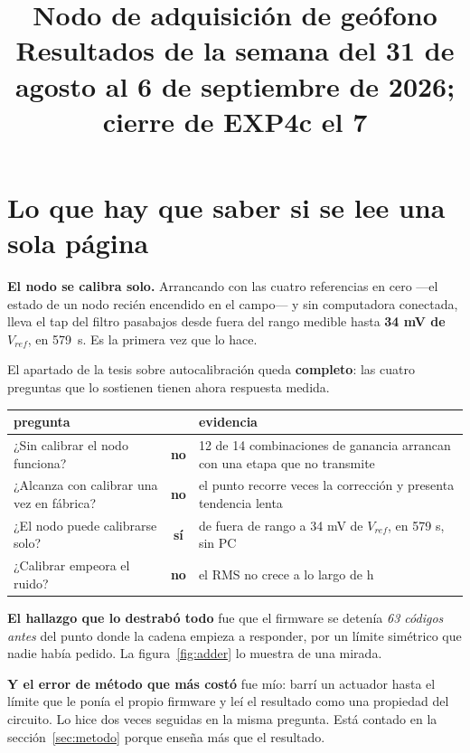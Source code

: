 \documentclass[11pt,a4paper]{article}
\title{\vspace{-1.5cm}\textbf{Nodo de adquisición de geófono}\\[2mm]
       \large Resultados de la semana del 31 de agosto al 6 de septiembre de 2026; cierre de EXP4c el 7}
\author{}
\date{}
\newcommand{\si}{\textcolor{verde}{\textbf{sí}}}
\newcommand{\no}{\textcolor{rojo}{\textbf{no}}}
\begin{document}
\maketitle
\vspace{-1.2cm}

\section*{Lo que hay que saber si se lee una sola página}

\textbf{El nodo se calibra solo.} Arrancando con las cuatro referencias en cero
---el estado de un nodo recién encendido en el campo--- y sin computadora conectada,
lleva el tap del filtro pasabajos desde fuera del rango medible hasta
\textbf{34 mV de $V_{ref}$}, en 579~s. Es la primera vez que lo hace.

El apartado de la tesis sobre autocalibración queda \textbf{completo}: las cuatro
preguntas que lo sostienen tienen ahora respuesta medida.

\begin{center}
\begin{tabular}{p{9.2cm} c p{4.4cm}}
\toprule
\textbf{pregunta} & & \textbf{evidencia} \\
\midrule
¿Sin calibrar el nodo funciona? & \no &
  12 de 14 combinaciones de ganancia arrancan con una etapa que no transmite \\[1mm]
¿Alcanza con calibrar una vez en fábrica? & \no &
  el punto recorre \derivaVeces{} veces la corrección y presenta tendencia lenta \\[1mm]
¿El nodo puede calibrarse solo? & \si &
  de fuera de rango a 34 mV de $V_{ref}$, en 579 s, sin PC \\[1mm]
¿Calibrar empeora el ruido? & \no &
  el RMS no crece a lo largo de \derivaHoras{} h \\
\bottomrule
\end{tabular}
\end{center}

\vspace{3mm}
\noindent\textbf{El hallazgo que lo destrabó todo} fue que el firmware se
detenía \emph{63 códigos antes} del punto donde la cadena empieza a responder,
por un límite simétrico que nadie había pedido. La figura~\ref{fig:adder} lo
muestra de una mirada.

\vspace{2mm}
\noindent\textbf{Y el error de método que más costó} fue mío: barrí un actuador
hasta el límite que le ponía el propio firmware y leí el resultado como una
propiedad del circuito. Lo hice dos veces seguidas en la misma pregunta. Está
contado en la sección~\ref{sec:metodo} porque enseña más que el resultado.
\end{document}
